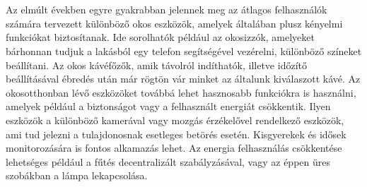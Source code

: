 \chapter{\bevezetes}


Az elmúlt években egyre gyakrabban jelennek meg az átlagos felhasználók számára tervezett különböző okos eszközök, amelyek általában plusz kényelmi funkciókat biztosítanak. Ide sorolhatók például az okosizzók, amelyeket bárhonnan tudjuk a lakásból egy telefon segítségével vezérelni, különböző színeket beállítani. Az okos kávéfőzők, amik távolról indíthatók, illetve időzítő beállításával ébredés után már rögtön vár minket az általunk kiválaszott kávé. Az okosotthonban lévő eszközöket továbbá lehet hasznosabb funkciókra is használni, amelyek például a biztonságot vagy a felhasznált energiát csökkentik. Ilyen eszközök a különböző kamerával vagy mozgás érzékelővel rendelkező eszközök, ami tud jelezni a tulajdonosnak esetleges betörés esetén. Kisgyerekek és idősek monitorozására is fontos alkamazás lehet. Az energia felhasználás csökkentése lehetséges például a fűtés decentralizált szabályzásával, vagy az éppen üres szobákban a lámpa lekapcsolása. 

